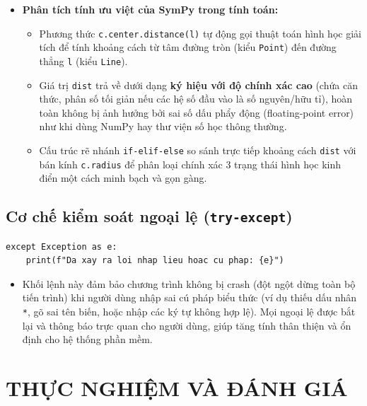 \documentclass[12pt,a4paper]{article}
\begin{document}
\begin{itemize}
    \item \textbf{Phân tích tính ưu việt của SymPy trong tính toán:}
    \begin{itemize}
        \item Phương thức \texttt{c.center.distance(l)} tự động gọi thuật toán hình học giải tích để tính khoảng cách từ tâm đường tròn (kiểu \texttt{Point}) đến đường thẳng \texttt{l} (kiểu \texttt{Line}).
        \item Giá trị \texttt{dist} trả về dưới dạng \textbf{ký hiệu với độ chính xác cao} (chứa căn thức, phân số tối giản nếu các hệ số đầu vào là số nguyên/hữu tỉ), hoàn toàn không bị ảnh hưởng bởi sai số dấu phẩy động (floating-point error) như khi dùng NumPy hay thư viện số học thông thường.
        \item Cấu trúc rẽ nhánh \texttt{if-elif-else} so sánh trực tiếp khoảng cách \texttt{dist} với bán kính \texttt{c.radius} để phân loại chính xác 3 trạng thái hình học kinh điển một cách minh bạch và gọn gàng.
    \end{itemize}
\end{itemize}

\subsection{Cơ chế kiểm soát ngoại lệ (\texttt{try-except})}

\begin{lstlisting}
except Exception as e:
    print(f"Da xay ra loi nhap lieu hoac cu phap: {e}")
\end{lstlisting}

\begin{itemize}
    \item Khối lệnh này đảm bảo chương trình không bị crash (đột ngột dừng toàn bộ tiến trình) khi người dùng nhập sai cú pháp biểu thức (ví dụ thiếu dấu nhân \texttt{*}, gõ sai tên biến, hoặc nhập các ký tự không hợp lệ). Mọi ngoại lệ được bắt lại và thông báo trực quan cho người dùng, giúp tăng tính thân thiện và ổn định cho hệ thống phần mềm.
\end{itemize}

\renewcommand{\arraystretch}{1.4} 
\pagebreak


\section{THỰC NGHIỆM VÀ ĐÁNH GIÁ}
\end{document}
